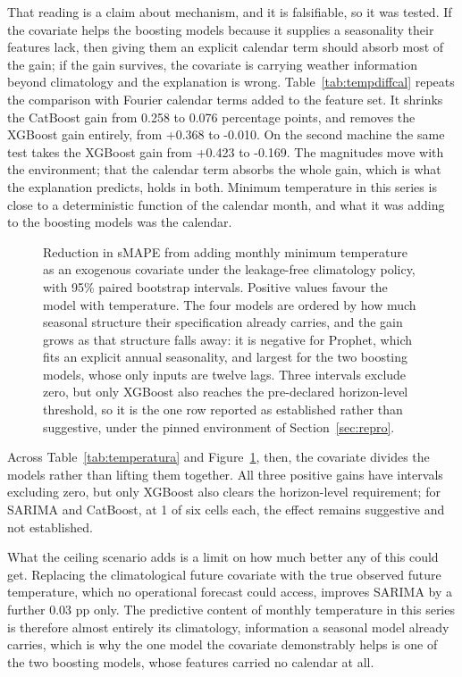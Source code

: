 

That reading is a claim about mechanism, and it is falsifiable, so it was tested. If the
covariate helps the boosting models because it supplies a seasonality their features lack,
then giving them an explicit calendar term should absorb most of the gain; if the gain
survives, the covariate is carrying weather information beyond climatology and the
explanation is wrong. Table~\ref{tab:tempdiffcal} repeats the comparison with Fourier calendar terms
added to the feature set. It shrinks the CatBoost gain from 0.258 to 0.076 percentage points,
and removes the XGBoost gain entirely, from +0.368 to -0.010. On the second machine the same
test takes the XGBoost gain from +0.423 to -0.169. The magnitudes move with the environment;
that the calendar term absorbs the whole gain, which is what the explanation predicts, holds
in both. Minimum
temperature in this series is close to a deterministic function of the calendar month, and
what it was adding to the boosting models was the calendar.

\begin{figure}[htbp]
\centering

\caption{Reduction in sMAPE from adding monthly minimum temperature as an exogenous
covariate under the leakage-free climatology policy, with 95\% paired bootstrap intervals.
Positive values favour the model with temperature. The four models are ordered by how much
seasonal structure their specification already carries, and the gain grows as that
structure falls away: it is negative for Prophet, which fits an explicit annual
seasonality, and largest for the two boosting models, whose only inputs are twelve lags.
Three intervals exclude zero, but only XGBoost also reaches the pre-declared horizon-level
threshold, so it is the one row reported as established rather than suggestive, under
the pinned environment of Section~\ref{sec:repro}.}
\label{fig:temp}
\end{figure}

Across Table~\ref{tab:temperatura} and Figure~\ref{fig:temp}, then, the covariate divides
the models rather than lifting them together. All three positive gains have intervals
excluding zero, but only XGBoost also clears the horizon-level requirement; for SARIMA and
CatBoost, at 1 of six cells each, the effect remains suggestive and not established.

What the ceiling scenario adds is a limit on how much better any of this could get.
Replacing the climatological future covariate with the true observed future temperature,
which no operational forecast could access, improves SARIMA by a further 0.03 pp only. The
predictive content of monthly temperature in this series is therefore almost entirely its
climatology, information a seasonal model already carries, which is why the one model the
covariate demonstrably helps is one of the two boosting models, whose features carried no
calendar at all.

